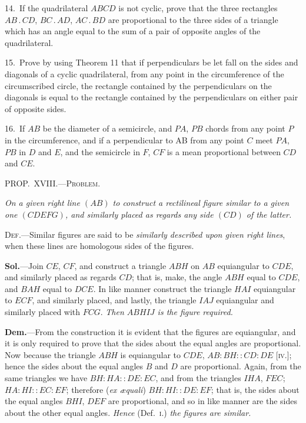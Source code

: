 \documentclass[oneside]{book}
\newcommand\mypropl[2]{
\bigskip\Needspace*{4\baselineskip}\begin{center}\textsc{#1}\end{center}
\hspace{\parindent}\emph{#2}\par\medskip
}
\newcommand\imgcent[2]{
\begin{center}

\end{center}
}
\begin{document}
\begin{footnotesize}
14.~If the quadrilateral $ABCD$ is not cyclic, prove that the
three rectangles $AB\,.\,CD$, $BC\,.\,AD$, $AC\,.\,BD$ are proportional to
the three sides of a triangle which has an angle equal to the sum
of a pair of opposite angles of the quadrilateral.

15.~Prove by using Theorem 11 that if perpendiculars be let
fall on the sides and diagonals of a cyclic quadrilateral, from any
point in the circumference of the circumscribed circle, the rectangle
contained by the perpendiculars on the diagonals is equal
to the rectangle contained by the perpendiculars on either pair of
opposite sides.

16.~If $AB$ be the diameter of a semicircle, and $PA$, $PB$ chords
from any point $P$ in the circumference, and if a perpendicular to
AB from any point $C$ meet $PA$, $PB$ in $D$ and $E$, and the semicircle
in $F$, $CF$ is a mean proportional between $CD$ and $CE$.
\par\end{footnotesize}

\mypropl{PROP\@.~XVIII\@.---Problem.}{On a given right line $(AB)$ to construct a rectilineal
figure similar to a given one $(CDEFG)$, and similarly
placed as regards any side $(CD)$ of the latter.}

\textsc{Def.}---Similar figures are said to be \emph{similarly described
upon given right lines}, when these lines are homologous
sides of the figures.


\imgcent{270}{f195}



\textbf{Sol.}---Join $CE$, $CF$, and construct a triangle $ABH$
on $AB$ equiangular to $CDE$, and similarly placed as
regards $CD$; that is, make, the angle $ABH$ equal to
$CDE$, and $BAH$ equal to $DCE$. In like manner construct
the triangle $HAI$ equiangular to $ECF$, and similarly
placed, and lastly, the triangle $IAJ$ equiangular
and similarly placed with $FCG$. \emph{Then $ABHIJ$ is the
figure required.}

\textbf{Dem.}---From the construction it is\label{isis} 
evident that the
figures are equiangular, and it is only required to prove
that the sides about the equal angles are proportional.
Now because the triangle $ABH$ is equiangular to $CDE$,
$AB : BH :: CD : DE$ [\textsc{iv.}]; hence the sides about the
equal angles $B$ and $D$ are proportional. Again, from
the same triangles we have $BH : HA :: DE : EC$, and
from the triangles $IHA$, $FEC$; $HA : HI :: EC : EF$;
therefore (\emph{ex {\ae}quali}) $BH : HI :: DE : EF$; that is, the
sides about the equal angles $BHI$, $DEF$ are proportional,
and so in like manner are the sides about the
other equal angles. \emph{Hence} (Def.~\textsc{i.}) \emph{the figures are
similar.}
\end{document}
